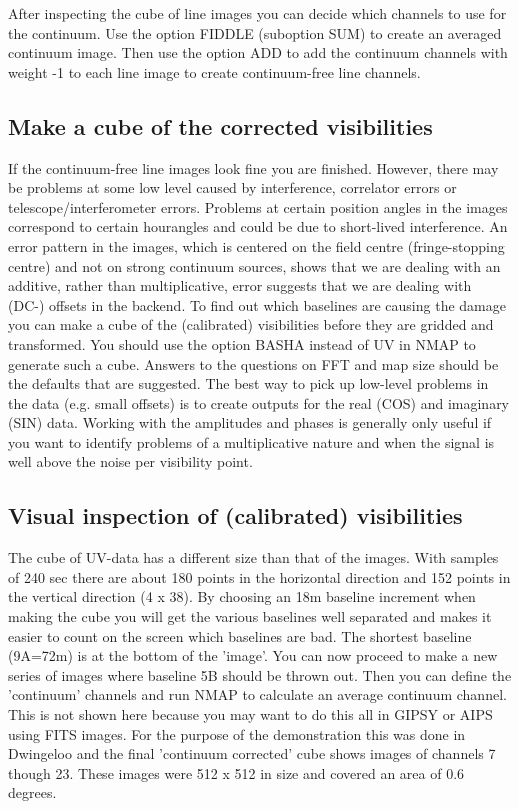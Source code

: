 After inspecting the cube of line images you can decide which channels to use
for the continuum. Use the option FIDDLE (suboption SUM) to create an averaged
continuum image. Then use the option ADD to add the continuum channels with
weight -1 to each line image to create continuum-free line channels. 

\subsection{Make a cube of the corrected visibilities} 
\label{.detail.cubecorr} 

If the continuum-free line images look fine you are finished. However, there
may be problems at some low level caused by interference, correlator errors or
telescope/interferometer errors. Problems at certain position angles in the
images correspond to certain hourangles and could be due to short-lived
interference. An error pattern in the images, which is centered on the field
centre (fringe-stopping centre) and not on strong continuum sources, shows that
we are dealing with an additive, rather than multiplicative, error suggests
that we are dealing with (DC-) offsets in the backend. To find out which
baselines are causing the damage you can make a cube of the (calibrated)
visibilities before they are gridded and transformed. You should use the option
BASHA instead of UV in NMAP to generate such a cube. Answers to the questions
on FFT and map size should be the defaults that are suggested. The best way to
pick up low-level problems in the data (e.g. small offsets) is to create
outputs for the real (COS) and imaginary (SIN) data. Working with the
amplitudes and phases is generally only useful if you want to identify problems
of a multiplicative nature and when the signal is well above the noise per
visibility point. 


\subsection{Visual inspection of (calibrated) visibilities} 
\label{.detail.inspcalvis} 

The cube of UV-data has a different size than that of the images. With samples
of 240 sec there are about 180 points in the horizontal direction and 152
points in the vertical direction (4 x 38). By choosing an 18m baseline
increment when making the cube you will get the various baselines well
separated and makes it easier to count on the screen which baselines are bad.
The shortest baseline (9A=72m) is at the bottom of the 'image'. You can now
proceed to make a new series of images where baseline 5B should be thrown out.
Then you can define the 'continuum' channels and run NMAP to calculate an
average continuum channel. This is not shown here because you may want to do
this all in GIPSY or AIPS using FITS images. For the purpose of the
demonstration this was done in Dwingeloo and the final 'continuum corrected'
cube shows images of channels 7 though 23. These images were 512 x 512 in size
and covered an area of 0.6 degrees. 


